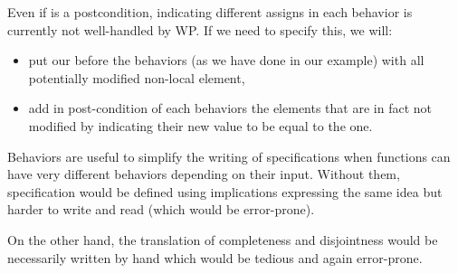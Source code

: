 \begin{Warning}
  Even if  is a postcondition, indicating different assigns
  in each behavior is currently not well-handled by WP. If we need to specify
  this, we will:
  \begin{itemize}
  \item put our  before the behaviors (as we have done in our
    example) with all potentially modified non-local element,
  \item add in post-condition of each behaviors the elements that are in fact
    not modified by indicating their new value to be equal to the
     one.
  \end{itemize}
\end{Warning}


Behaviors are useful to simplify the writing of specifications when
functions can have very different behaviors depending on their input.
Without them, specification would be defined using implications
expressing the same idea but harder to write and read (which would be
error-prone).



On the other hand, the translation of completeness and disjointness
would be necessarily written by hand which would be tedious and again
error-prone.
